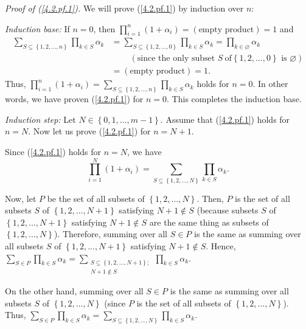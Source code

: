 \documentclass[numbers=enddot,12pt,final,onecolumn,notitlepage]{scrartcl}%
\begin{document}
\textit{Proof of (\ref{4.2.pf.1}).} We will prove (\ref{4.2.pf.1}) by
induction over $n$:

\textit{Induction base:} If $n=0$, then $\prod\limits_{i=1}^{n}\left(
1+\alpha_{i}\right)  =\left(  \text{empty product}\right)  =1$ and
\begin{align*}
\sum\limits_{S\subseteq\left\{  1,2,...,n\right\}  }\prod\limits_{k\in
S}\alpha_{k}  &  =\sum\limits_{S\subseteq\left\{  1,2,...,0\right\}  }%
\prod\limits_{k\in S}\alpha_{k}=\prod\limits_{k\in\varnothing}\alpha_{k}\\
&  \ \ \ \ \ \ \ \ \ \ \left(  \text{since the only subset }S\ \text{of
}\left\{  1,2,...,0\right\}  \text{ is }\varnothing\right) \\
&  =\left(  \text{empty product}\right)  =1.
\end{align*}
Thus, $\prod\limits_{i=1}^{n}\left(  1+\alpha_{i}\right)  =\sum
\limits_{S\subseteq\left\{  1,2,...,n\right\}  }\prod\limits_{k\in S}%
\alpha_{k}$ holds for $n=0$. In other words, we have proven (\ref{4.2.pf.1})
for $n=0$. This completes the induction base.

\textit{Induction step:} Let $N\in\left\{  0,1,...,m-1\right\}  $. Assume that
(\ref{4.2.pf.1}) holds for $n=N$. Now let us prove (\ref{4.2.pf.1}) for
$n=N+1$.

Since (\ref{4.2.pf.1}) holds for $n=N$, we have%
\[
\prod\limits_{i=1}^{N}\left(  1+\alpha_{i}\right)  =\sum\limits_{S\subseteq
\left\{  1,2,...,N\right\}  }\prod\limits_{k\in S}\alpha_{k}.
\]


Now, let $P$ be the set of all subsets of $\left\{  1,2,...,N\right\}  $.
Then, $P$ is the set of all subsets $S$ of $\left\{  1,2,...,N+1\right\}  $
satisfying $N+1\notin S$ (because subsets $S$ of $\left\{
1,2,...,N+1\right\}  $ satisfying $N+1\notin S$ are the same thing as subsets
of $\left\{  1,2,...,N\right\}  $). Therefore, summing over all $S\in P$ is
the same as summing over all subsets $S$ of $\left\{  1,2,...,N+1\right\}  $
satisfying $N+1\notin S$. Hence, $\sum\limits_{S\in P}\prod\limits_{k\in
S}\alpha_{k}=\sum\limits_{\substack{S\subseteq\left\{  1,2,...,N+1\right\}
;\\N+1\notin S}}\prod\limits_{k\in S}\alpha_{k}$.

On the other hand, summing over all $S\in P$ is the same as summing over all
subsets $S$ of $\left\{  1,2,...,N\right\}  $ (since $P$ is the set of all
subsets of $\left\{  1,2,...,N\right\}  $). Thus, $\sum\limits_{S\in P}%
\prod\limits_{k\in S}\alpha_{k}=\sum\limits_{S\subseteq\left\{
1,2,...,N\right\}  }\prod\limits_{k\in S}\alpha_{k}$.
\end{document}
